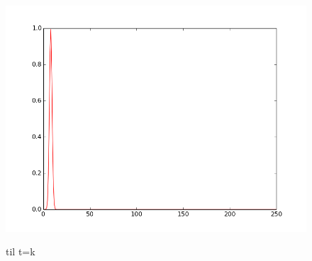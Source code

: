 \documentclass[12pt, a4paper]{article}
\begin{document}
\begin{figure}[h!]
	\centering
	\includegraphics[scale=0.5]{die_welle9.png}\\
	\caption{til t=k}
\end{figure}
\end{document}
